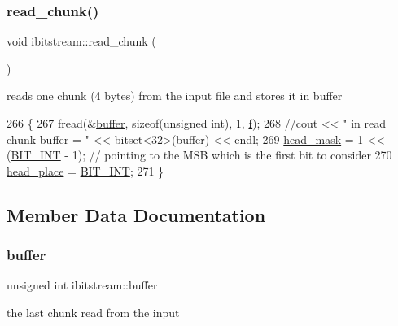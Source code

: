 \subsubsection{\texorpdfstring{read\+\_\+chunk()}{read\_chunk()}}
{\footnotesize\ttfamily void ibitstream\+::read\+\_\+chunk (\begin{DoxyParamCaption}{ }\end{DoxyParamCaption})}



reads one chunk (4 bytes) from the input file and stores it in buffer 


\begin{DoxyCode}
266                            \{
267   fread(&\hyperlink{classibitstream_a73f0b24d3d4402369f1abbb43f7f70ef}{buffer}, \textcolor{keyword}{sizeof}(\textcolor{keywordtype}{unsigned} \textcolor{keywordtype}{int}), 1, \hyperlink{classibitstream_a3ea2cdd0cf97820f0e1520c42e364308}{f});
268   \textcolor{comment}{//cout << " in read chunk  buffer = " << bitset<32>(buffer) << endl;}
269   \hyperlink{classibitstream_a48cd41991b6c29ea5120b53873a72a70}{head\_mask} = 1 << (\hyperlink{bitstream_8h_afcadf5aa65c5159bfb96c4d82ebc0a5d}{BIT\_INT} - 1); \textcolor{comment}{// pointing to the MSB which is the first bit to consider}
270   \hyperlink{classibitstream_a7b96359ac1534a5565e6e9b0cc53a0b3}{head\_place} = \hyperlink{bitstream_8h_afcadf5aa65c5159bfb96c4d82ebc0a5d}{BIT\_INT};
271 \}
\end{DoxyCode}


\subsection{Member Data Documentation}
\mbox{\label{classibitstream_a73f0b24d3d4402369f1abbb43f7f70ef}} 
\subsubsection{\texorpdfstring{buffer}{buffer}}
{\footnotesize\ttfamily unsigned int ibitstream\+::buffer\hspace{0.3cm}{\ttfamily [private]}}



the last chunk read from the input 

\mbox{\label{classibitstream_a3ea2cdd0cf97820f0e1520c42e364308}} 
